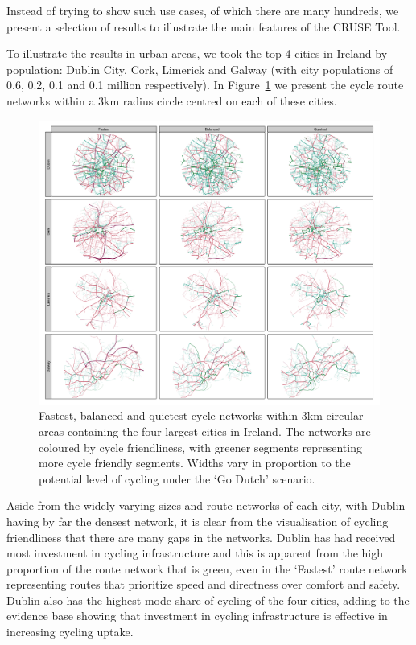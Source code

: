 \documentclass[
  super,
  preprint,
  3p]{elsarticle}
\begin{document}
Instead of trying to show such use cases, of which there are many
hundreds, we present a selection of results to illustrate the main
features of the CRUSE Tool.

To illustrate the results in urban areas, we took the top 4 cities in
Ireland by population: Dublin City, Cork, Limerick and Galway (with city
populations of 0.6, 0.2, 0.1 and 0.1 million respectively). In
Figure~\ref{fig-city-results} we present the cycle route networks within
a 3km radius circle centred on each of these cities.

\begin{figure}

{\centering 

\includegraphics{images/rnet_types.png}

}

\caption{\label{fig-city-results}Fastest, balanced and quietest cycle
networks within 3km circular areas containing the four largest cities in
Ireland. The networks are coloured by cycle friendliness, with greener
segments representing more cycle friendly segments. Widths vary in
proportion to the potential level of cycling under the `Go Dutch'
scenario.}

\end{figure}

Aside from the widely varying sizes and route networks of each city,
with Dublin having by far the densest network, it is clear from the
visualisation of cycling friendliness that there are many gaps in the
networks. Dublin has had received most investment in cycling
infrastructure and this is apparent from the high proportion of the
route network that is green, even in the `Fastest' route network
representing routes that prioritize speed and directness over comfort
and safety. Dublin also has the highest mode share of cycling of the
four cities, adding to the evidence base showing that investment in
cycling infrastructure is effective in increasing cycling uptake.
\end{document}

